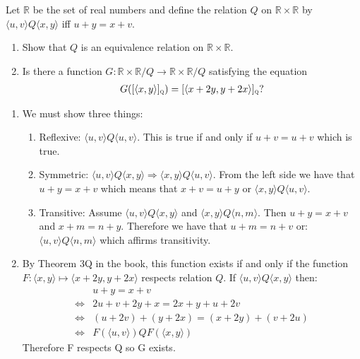 \documentclass[12pt,letterpaper,boxed]{hmcpset}
\newcommand{\texttiny}[1]{\textnormal{\tiny \textsc{#1}}}
\newcommand{\pair}[2]{\langle #1, #2 \rangle}
\begin{document}
\begin{problem}[3.41]
  Let $\mathbb{R}$ be the set of real numbers and define the relation $Q$ on $\mathbb{R} \times \mathbb{R}$ by $\langle u,v \rangle Q \langle x,y \rangle$ iff $u + y = x + v$.
  \begin{enumerate}
    \item Show that $Q$ is an equivalence relation on $\mathbb{R} \times \mathbb{R}$.
    \item Is there a function $G: \mathbb{R} \times \mathbb{R}/Q \to \mathbb{R} \times \mathbb{R}/Q$ satisfying the equation
      \begin{align*}
        G([\langle x,y\rangle]_{\texttiny{Q}})=[\langle x+2y, y+2x\rangle]_{\texttiny{Q}}\text{?}
      \end{align*}
  \end{enumerate}
\end{problem}
\begin{solution}
  \begin{enumerate}
    \item We must show three things: 
      \begin{enumerate}
        \item Reflexive: $\langle u,v\rangle Q\langle u,v\rangle$. This is true if and only if $u+v=u+v$ which is true.
        \item Symmetric: $\langle u,v\rangle Q\langle x,y\rangle \Rightarrow \langle x,y\rangle Q\langle u,v\rangle$. From the left side we have that $u+y=x+v$ which means that $x+v=u+y$ or $\langle x,y\rangle Q\langle u,v\rangle$.
        \item Transitive: Assume $\langle u,v\rangle Q\langle x,y\rangle$ and $\langle x,y\rangle Q\langle n,m\rangle$. Then $u+y=x+v$ and $x+m=n+y$. Therefore we have that $u+m=n+v$ or: $\langle u,v \rangle Q\langle n,m\rangle$ which affirms transitivity.
      \end{enumerate}
    \item By Theorem 3Q in the book, this function exists if and only if the function $F:\pair{x}{y} \mapsto \pair{x+2y}{y+2x}$ respects relation $Q$. If $\pair{u}{v}Q\pair{x}{y}$ then:
      \begin{align*}
        &u+y=x+v \\
        \iff &2u+v+2y+x=2x+y+u+2v \\
        \iff &(u+2v)+(y+2x)=(x+2y)+(v+2u)\\
        \iff &F(\pair{u}{v})QF(\pair{x}{y})
      \end{align*}
      Therefore F respects Q so G exists.
  \end{enumerate}
\end{solution}
\end{document}
